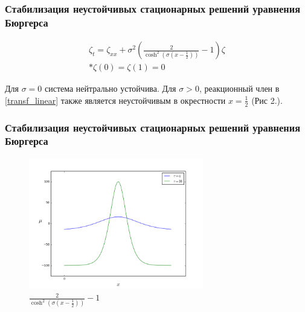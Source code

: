\documentclass{beamer}
\begin{document}
\begin{frame}
\frametitle{Стабилизация неустойчивых стационарных решений уравнения Бюргерса}

\begin{block}{}
\begin{gather} \label{transf_linear}
  \zeta_t = \zeta_{xx} + \sigma^2 \left( \frac{2}{\cosh^2(\sigma(x - \frac{1}{2}))} - 1 \right) \zeta \\* 
  \zeta(0) = \zeta(1) = 0 
\end{gather}
\end{block}

Для $\sigma = 0$ система нейтрально устойчива. Для $\sigma > 0$, реакционный член в \eqref{transf_linear} также является неустойчивым в окрестности $x = \frac{1}{2}$ (Рис 2.).

\end{frame}

\begin{frame}
\frametitle{Стабилизация неустойчивых стационарных решений уравнения Бюргерса}

\begin{figure}[H]
  \centering
  \includegraphics[width=3in]{fig2}
  \caption{$\frac{2}{\cosh^2(\sigma(x - \frac{1}{2}))} - 1$}
\end{figure}

\end{frame}
\end{document}
